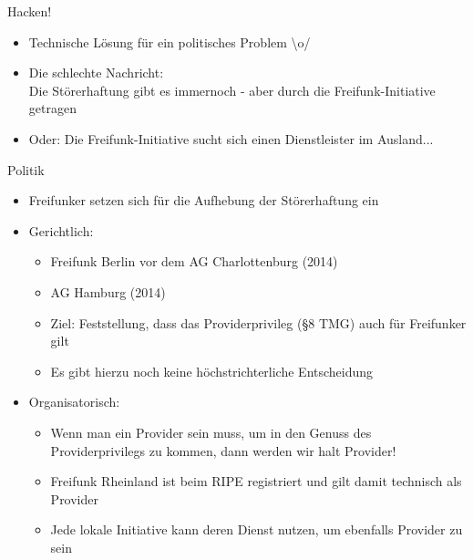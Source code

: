 \documentclass[fleqn,11pt,aspectratio=169]{beamer}
\begin{document}
\begin{frame}{Hacken!}
\begin{itemize}
	\item Technische Lösung für ein politisches Problem \textbackslash o/
	\item Die schlechte Nachricht: \\Die Störerhaftung gibt es immernoch - aber durch die Freifunk-Initiative getragen
	\pause
	\item Oder: Die Freifunk-Initiative sucht sich einen Dienstleister im Ausland...
\end{itemize}
\end{frame}

\begin{frame}{Politik}
\begin{itemize}
	\item Freifunker setzen sich für die Aufhebung der Störerhaftung ein 
	\pause
	\item Gerichtlich:
	\begin{itemize}
		\item Freifunk Berlin vor dem AG Charlottenburg (2014)
		\item AG Hamburg (2014)
		\item Ziel: Feststellung, dass das Providerprivileg (§8 TMG) auch für Freifunker gilt
		\item Es gibt hierzu noch keine höchstrichterliche Entscheidung
	\end{itemize}
	\pause
	\item Organisatorisch:
	\begin{itemize}
		\item Wenn man ein Provider sein muss, um in den Genuss des Providerprivilegs zu kommen, dann werden wir halt Provider!
		\item Freifunk Rheinland ist beim RIPE registriert und gilt damit technisch als Provider 
		\item Jede lokale Initiative kann deren Dienst nutzen, um ebenfalls Provider zu sein
	\end{itemize}
\end{itemize}
\end{frame}
\end{document}

